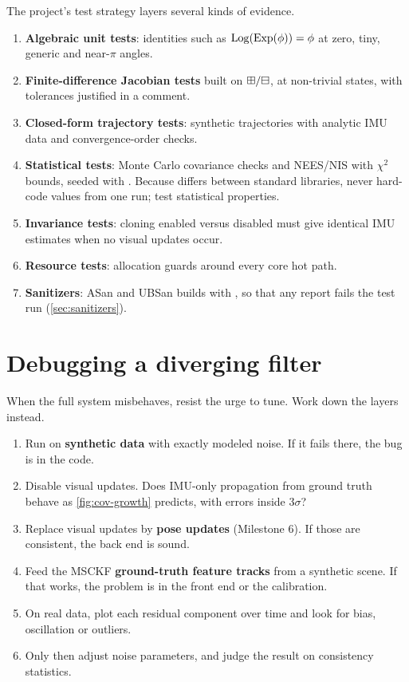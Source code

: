The project's test strategy layers several kinds of evidence.
\begin{enumerate}
  \item \textbf{Algebraic unit tests}: identities such as $\operatorname{Log}(\operatorname{Exp}(\phi)) = \phi$ at zero, tiny, generic and near-$\pi$ angles.
  \item \textbf{Finite-difference Jacobian tests} built on $\boxplus/\boxminus$, at non-trivial states, with tolerances justified in a comment.
  \item \textbf{Closed-form trajectory tests}: synthetic trajectories with analytic IMU data and convergence-order checks.
  \item \textbf{Statistical tests}: Monte Carlo covariance checks and NEES/NIS with $\chi^2$ bounds, seeded with
        . Because  differs between standard libraries, never hard-code values from one
        run; test statistical properties.
  \item \textbf{Invariance tests}: cloning enabled versus disabled must give identical IMU estimates when no visual updates occur.
  \item \textbf{Resource tests}: allocation guards around every core hot path.
  \item \textbf{Sanitizers}: ASan and UBSan builds with , so that any report fails the test run
        (\cref{sec:sanitizers}).
\end{enumerate}

\section{Debugging a diverging filter}

When the full system misbehaves, resist the urge to tune. Work down the layers instead.
\begin{enumerate}
  \item Run on \textbf{synthetic data} with exactly modeled noise. If it fails there, the bug is in the code.
  \item Disable visual updates. Does IMU-only propagation from ground truth behave as \cref{fig:cov-growth} predicts, with errors
        inside $3\sigma$?
  \item Replace visual updates by \textbf{pose updates} (Milestone 6). If those are consistent, the back end is sound.
  \item Feed the MSCKF \textbf{ground-truth feature tracks} from a synthetic scene. If that works, the problem is in the front end or the
        calibration.
  \item On real data, plot each residual component over time and look for bias, oscillation or outliers.
  \item Only then adjust noise parameters, and judge the result on consistency statistics.
\end{enumerate}

